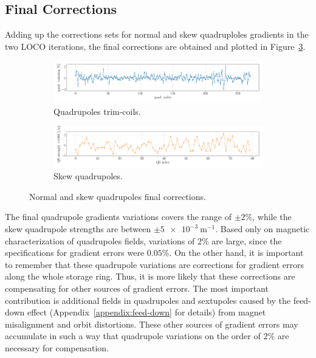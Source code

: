 \subsection{Final Corrections}
Adding up the corrections sets for normal and skew quadruploles gradients in the two LOCO iterations, the final corrections are obtained and plotted in Figure~\ref{fig:loco_corrections_final}.
\begin{figure}
\centering
\begin{subfigure}[t]{1.0\textwidth}
\includegraphics[width=1.0\textwidth]{figures/loco_quad_corrections_errorbar_big.pdf}
    \caption{Quadrupoles trim-coils.}
    \label{subfig:quad_fit_final}
\end{subfigure}
 \begin{subfigure}[t]{1.0\textwidth}
\includegraphics[width=1.0\textwidth]{figures/loco_qs_corrections_errorbar_big.pdf}
    \caption{Skew quadrupoles.}
    \label{subfig:qs_fit_final}
\end{subfigure}
\caption{Normal and skew quadrupoles final corrections.}
\label{fig:loco_corrections_final}
\end{figure}

The final quadrupole gradients variations covers the range of $\pm 2\%$, while the skew quadrupole strengths are between $\pm \SI{5e-3}{\meter^{-1}}$. Based only on magnetic characterization of quadrupoles fields, variations of $2\%$ are large, since the specifications for gradient errors were $0.05\%$. On the other hand, it is important to remember that these quadrupole variations are corrections for gradient errors along the whole storage ring. Thus, it is more likely that these corrections are compensating for other sources of gradient errors. The most important contribution is additional fields in quadrupoles and sextupoles caused by the feed-down effect (Appendix~\ref{appendix:feed-down} for details) from magnet misalignment and orbit distortions. These other sources of gradient errors may accumulate in such a way that quadrupole variations on the order of $2\%$ are necessary for compensation.

